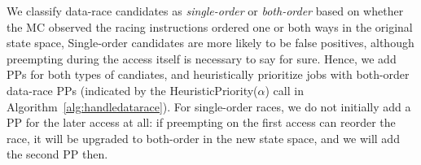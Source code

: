 We classify data-race candidates as {\em single-order} or {\em both-order} \cite{portend}
based on whether the MC observed the racing instructions ordered one or both ways in the original state space,
Single-order candidates are more likely to be false positives,
although preempting during the access itself is necessary to say for sure.
Hence, we add PPs for both types of candiates, and heuristically prioritize jobs with both-order data-race PPs
(indicated by the HeuristicPriority($\alpha$) call in Algorithm~\ref{alg:handledatarace}).
For single-order races, we do not initially add a PP for the later access at all:
if preempting on the first access can reorder the race, it will be upgraded to both-order in the new state space, and we will add the second PP then.

